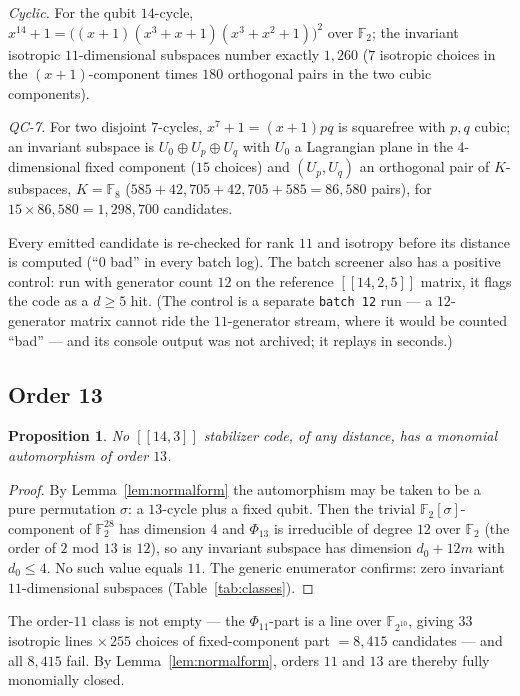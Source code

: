 \documentclass[11pt]{amsart}
\newcommand{\FF}{\mathbb{F}_{2}}
\newcommand{\code}[3]{[[#1,#2,#3]]}
\theoremstyle{plain}
\newtheorem{proposition}[theorem]{Proposition}
\theoremstyle{definition}
\theoremstyle{remark}
\begin{document}
\emph{Cyclic.} For the qubit $14$-cycle, $x^{14}+1=\bigl((x+1)(x^{3}+x+1)
(x^{3}+x^{2}+1)\bigr)^{2}$ over $\FF$; the invariant isotropic
$11$-dimensional subspaces number exactly $1{,}260$ ($7$ isotropic
choices in the $(x+1)$-component times $180$ orthogonal pairs in the two
cubic components).

\emph{QC-7.} For two disjoint $7$-cycles, $x^{7}+1=(x+1)pq$ is squarefree
with $p,q$ cubic; an invariant subspace is $U_{0}\oplus U_{p}\oplus
U_{q}$ with $U_{0}$ a Lagrangian plane in the $4$-dimensional fixed
component ($15$ choices) and $(U_{p},U_{q})$ an orthogonal pair of
$K$-subspaces, $K=\mathbb{F}_{8}$ ($585+42{,}705+42{,}705+585=86{,}580$
pairs), for $15\times86{,}580=1{,}298{,}700$ candidates.

Every emitted candidate is re-checked for rank $11$ and isotropy before
its distance is computed (``0 bad'' in every batch log). The batch
screener also has a positive control: run with generator count $12$ on
the reference $\code{14}{2}{5}$ matrix, it flags the code as a $d\ge5$
hit. (The control is a separate \texttt{batch 12} run --- a
$12$-generator matrix cannot ride the $11$-generator stream, where it
would be counted ``bad'' --- and its console output was not archived; it
replays in seconds.)

\subsection{Order 13}
\begin{proposition}\label{prop:13}
No $[[14,3]]$ stabilizer code, of any distance, has a monomial
automorphism of order $13$.
\end{proposition}

\begin{proof}
By Lemma~\ref{lem:normalform} the automorphism may be taken to be a pure
permutation $\sigma$: a $13$-cycle plus a fixed qubit. Then the trivial
$\FF[\sigma]$-component of $\FF^{28}$ has dimension $4$ and $\Phi_{13}$
is irreducible of degree $12$ over $\FF$ (the order of $2$ mod $13$ is
$12$), so any invariant subspace has dimension $d_{0}+12m$ with
$d_{0}\le4$. No such value equals $11$. The generic enumerator confirms:
zero invariant $11$-dimensional subspaces
(Table~\ref{tab:classes}).
\end{proof}

The order-$11$ class is not empty --- the $\Phi_{11}$-part is a line over
$\mathbb{F}_{2^{10}}$, giving $33$ isotropic lines $\times\,255$ choices
of fixed-component part $=8{,}415$ candidates --- and all $8{,}415$ fail.
By Lemma~\ref{lem:normalform}, orders $11$ and $13$ are thereby fully
monomially closed.
\end{document}
